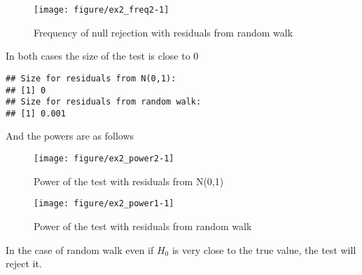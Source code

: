 \documentclass[12pt, a4paper]{article}\usepackage[]{graphicx}\usepackage[]{color}
\makeatletter
\def\maxwidth{ %
  \ifdim\Gin@nat@width>\linewidth
    \linewidth
  \else
    \Gin@nat@width
  \fi
}
\newenvironment{kframe}{%
 \def\at@end@of@kframe{}%
 \ifinner\ifhmode%
  \def\at@end@of@kframe{\end{minipage}}%
  \begin{minipage}{\columnwidth}%
 \fi\fi%
 \def\FrameCommand##1{\hskip\@totalleftmargin \hskip-\fboxsep
 \colorbox{shadecolor}{##1}\hskip-\fboxsep
     \hskip-\linewidth \hskip-\@totalleftmargin \hskip\columnwidth}%
 \MakeFramed {\advance\hsize-\width
   \@totalleftmargin\z@ \linewidth\hsize
   \@setminipage}}%
 {\par\unskip\endMakeFramed%
 \at@end@of@kframe}
\newenvironment{knitrout}{}{} %
\makeatother
\begin{document}
\begin{knitrout}
\color{fgcolor}\begin{figure}[H]

{\centering \texttt{[image: figure/ex2\_freq2-1]} 

}

\caption[Frequency of null rejection with residuals from random walk]{Frequency of null rejection with residuals from random walk}\label{fig:ex2.freq2}
\end{figure}


\end{knitrout}

In both cases the size of the test is close to 0
\begin{knitrout}
\color{fgcolor}\begin{kframe}
\begin{verbatim}
## Size for residuals from N(0,1):
## [1] 0
## Size for residuals from random walk:
## [1] 0.001
\end{verbatim}
\end{kframe}
\end{knitrout}

And the powers are as follows 
\begin{knitrout}
\color{fgcolor}\begin{figure}[H]

{\centering \texttt{[image: figure/ex2\_power2-1]} 

}

\caption[Power of the test with residuals from N(0,1)]{Power of the test with residuals from N(0,1)}\label{fig:ex2.power2}
\end{figure}


\end{knitrout}

\begin{knitrout}
\color{fgcolor}\begin{figure}[H]

{\centering \texttt{[image: figure/ex2\_power1-1]} 

}

\caption[Power of the test with residuals from random walk]{Power of the test with residuals from random walk}\label{fig:ex2.power1}
\end{figure}


\end{knitrout}

In the case of random walk even if $H_0$ is very close to the true value, the test will reject it.
\end{document}
